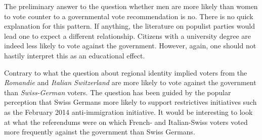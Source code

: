 \documentclass[11pt,a4paper]{article}\usepackage[]{graphicx}\usepackage[]{color}
\begin{document}
    The preliminary answer to the question whether men are more likely than women to vote counter to a governmental vote recommendation is no. There is no quick explanation for this pattern. If anything, the literature on populist parties would lead one to expect a different relationship. Citizens with a university degree are indeed less likely to vote against the government. However, again, one should not hastily interpret this as an educational effect. 
    
    Contrary to what the question about regional identity implied voters from the \textit{Romandie} and \textit{Italian Switzerland} are more likely to vote against the government than \textit{Swiss-German} voters. The question has been guided by the popular perception that Swiss Germans more likely to support restrictives initiatives such as the February 2014 anti-immigration initiative. It would be interesting to look at what the referendums were on which French- and Italian-Swiss voters voted more frequently against the government than Swiss Germans.
    
\end{document}
